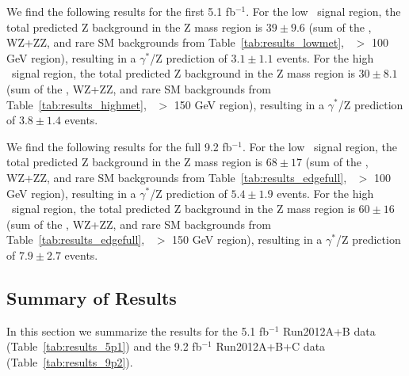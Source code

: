 We find the following results for the first 5.1 fb$^{-1}$. For the low \MET\ signal region, the total predicted Z background in the Z mass region is $39\pm9.6$ 
(sum of the \zjets, WZ+ZZ, and rare SM backgrounds from Table~\ref{tab:results_lowmet}, \MET\ $>$ 100 GeV region), 
resulting in a $\gamma^*$/Z prediction of $3.1\pm1.1$ events. 
For the high \MET\ signal region, the total predicted Z background in the Z mass region is $30\pm8.1$ 
(sum of the \zjets, WZ+ZZ, and rare SM backgrounds from Table~\ref{tab:results_highmet}, \MET\ $>$ 150 GeV region), 
resulting in a $\gamma^*$/Z prediction of $3.8\pm1.4$ events. 

We find the following results for the full 9.2 fb$^{-1}$. For the low \MET\ signal region, the total predicted Z background in the Z mass region is $68\pm17$ 
(sum of the \zjets, WZ+ZZ, and rare SM backgrounds from Table~\ref{tab:results_edgefull}, \MET\ $>$ 100 GeV region), 
resulting in a $\gamma^*$/Z prediction of $5.4\pm1.9$ events. 
For the high \MET\ signal region, the total predicted Z background in the Z mass region is $60\pm16$ 
(sum of the \zjets, WZ+ZZ, and rare SM backgrounds from Table~\ref{tab:results_edgefull}, \MET\ $>$ 150 GeV region), 
resulting in a $\gamma^*$/Z prediction of $7.9\pm2.7$ events. 

\clearpage

\subsection{Summary of Results}

In this section we summarize the results for the 5.1 fb$^{-1}$ Run2012A+B data (Table~\ref{tab:results_5p1})
and the 9.2 fb$^{-1}$ Run2012A+B+C data (Table~\ref{tab:results_9p2}).

